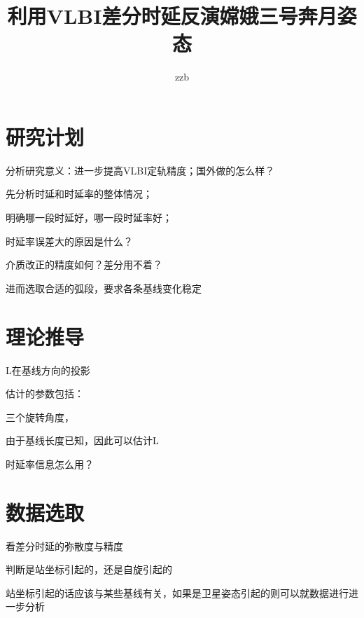 \documentclass[12pt]{article}
\title{利用VLBI差分时延反演嫦娥三号奔月姿态\\ }
\author{zzb \\ }
\begin{document}
\maketitle

\section{研究计划}
分析研究意义：进一步提高VLBI定轨精度；国外做的怎么样？

先分析时延和时延率的整体情况；

明确哪一段时延好，哪一段时延率好；

时延率误差大的原因是什么？

介质改正的精度如何？差分用不着？


进而选取合适的弧段，要求各条基线变化稳定


\section{理论推导}

L在基线方向的投影

估计的参数包括：

三个旋转角度，

由于基线长度已知，因此可以估计L


时延率信息怎么用？


\section{数据选取}
看差分时延的弥散度与精度



判断是站坐标引起的，还是自旋引起的

站坐标引起的话应该与某些基线有关，如果是卫星姿态引起的则可以就数据进行进一步分析






%
%
\end{document}
